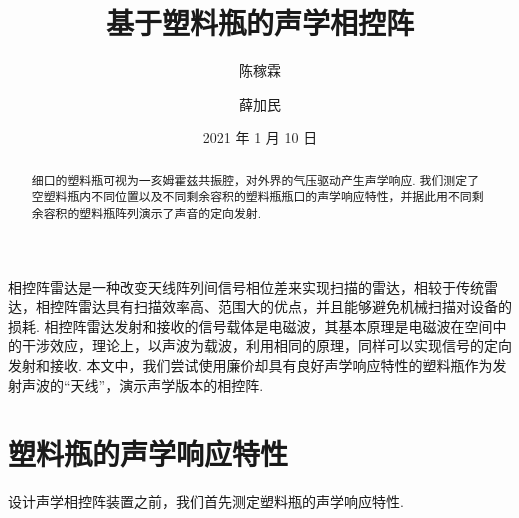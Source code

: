 \documentclass[a4paper, 10pt]{article}
\begin{document}
\title{基于塑料瓶的声学相控阵}
\author{陈稼霖\and 薛加民}
\date{2021 年 1 月 10 日}
\maketitle
\begin{abstract}
细口的塑料瓶可视为一亥姆霍兹共振腔，对外界的气压驱动产生声学响应. 我们测定了空塑料瓶内不同位置以及不同剩余容积的塑料瓶瓶口的声学响应特性，并据此用不同剩余容积的塑料瓶阵列演示了声音的定向发射.
\end{abstract}

相控阵雷达是一种改变天线阵列间信号相位差来实现扫描的雷达，相较于传统雷达，相控阵雷达具有扫描效率高、范围大的优点，并且能够避免机械扫描对设备的损耗. 相控阵雷达发射和接收的信号载体是电磁波，其基本原理是电磁波在空间中的干涉效应，理论上，以声波为载波，利用相同的原理，同样可以实现信号的定向发射和接收. 本文中，我们尝试使用廉价却具有良好声学响应特性的塑料瓶作为发射声波的“天线”，演示声学版本的相控阵.

\section{塑料瓶的声学响应特性}
设计声学相控阵装置之前，我们首先测定塑料瓶的声学响应特性.
\end{document}
